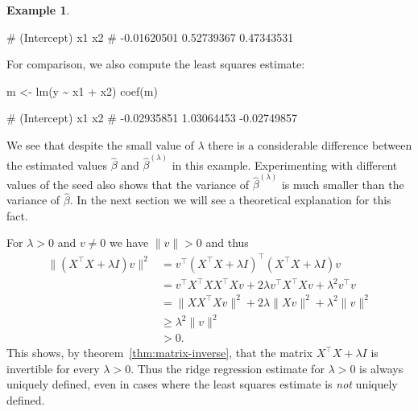 \documentclass[
  a4paper,
]{article}
\newenvironment{Shaded}{\begin{snugshade}}{\end{snugshade}}
\newcommand{\FunctionTok}[1]{\textcolor[rgb]{0.00,0.00,0.00}{#1}}
\newcommand{\NormalTok}[1]{#1}
\newcommand{\OtherTok}[1]{\textcolor[rgb]{0.56,0.35,0.01}{#1}}
\newcommand{\SpecialCharTok}[1]{\textcolor[rgb]{0.00,0.00,0.00}{#1}}
\theoremstyle{definition}
\theoremstyle{definition}
\newtheorem{example}{Example}[section]
\theoremstyle{definition}
\theoremstyle{definition}
\theoremstyle{remark}
\begin{document}
\begin{example}
\begin{Shaded}
\begin{Highlighting}[]
\NormalTok{\# (Intercept)          x1          x2 }
\NormalTok{\# {-}0.01620501  0.52739367  0.47343531}
\end{Highlighting}
\end{Shaded}

For comparison, we also compute the least squares estimate:

\begin{Shaded}
\begin{Highlighting}[]
\NormalTok{m }\OtherTok{\textless{}{-}} \FunctionTok{lm}\NormalTok{(y }\SpecialCharTok{\textasciitilde{}}\NormalTok{ x1 }\SpecialCharTok{+}\NormalTok{ x2)}
\FunctionTok{coef}\NormalTok{(m)}
\end{Highlighting}
\end{Shaded}

\begin{Shaded}
\begin{Highlighting}[]
\NormalTok{\# (Intercept)          x1          x2 }
\NormalTok{\# {-}0.02935851  1.03064453 {-}0.02749857}
\end{Highlighting}
\end{Shaded}

We see that despite the small value of \(\lambda\) there is a considerable
difference between the estimated values \(\hat\beta\) and
\(\hat\beta^{(\lambda)}\) in this example. Experimenting with different
values of the seed also shows that the variance of \(\hat\beta^{(\lambda)}\)
is much smaller than the variance of \(\hat\beta\). In the next section
we will see a theoretical explanation for this fact.
\end{example}

For \(\lambda > 0\) and \(v \neq 0\) we have \(\|v\| > 0\) and thus
\begin{align*}
  \| (X^\top X + \lambda I) v \|^2
  &= v^\top (X^\top X + \lambda I)^\top (X^\top X + \lambda I) v \\
  &= v^\top X^\top X X^\top X v + 2 \lambda v^\top X^\top X v + \lambda^2 v^\top v \\
  &= \| X X^\top X v \|^2 + 2 \lambda \| X v \|^2 + \lambda^2 \| v \|^2 \\
  &\geq \lambda^2 \| v \|^2 \\
  &> 0.
\end{align*}
This shows, by theorem~\ref{thm:matrix-inverse}, that
the matrix \(X^\top X + \lambda I\)
is invertible for every \(\lambda > 0\). Thus the
ridge regression estimate for \(\lambda > 0\) is always uniquely defined,
even in cases where the least squares estimate is \emph{not} uniquely defined.
\end{document}
